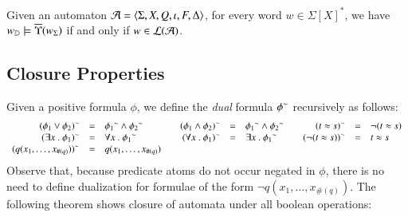 \documentclass{llncs}
\begin{document}
\begin{lemma}\label{lemma:substitution}
  Given an automaton $\mathcal{A} = \langle \Sigma,X,Q,\iota,F,\Delta \rangle$, for
  every word $w \in \Sigma[X]^*$, we have $w_{\mathbb{D}} \models
  \overline{\Upsilon}({w_\Sigma})$ if and only if $w \in {\mathcal L}({\mathcal{A}})$.
\end{lemma}

\subsection{Closure Properties}
\label{sec:closure}

Given a positive formula $\phi$, we define the \emph{dual} formula
${\phi}^{\sim}$ recursively as follows:
\[\begin{array}{rclcrclcrcl}
{(\phi_1 \vee \phi_2)}^{\sim} & = & {\phi_1}^{\sim} \wedge {\phi_2}^{\sim} && 
{(\phi_1 \wedge \phi_2)}^{\sim} & = & {\phi_1}^{\sim} \wedge {\phi_2}^{\sim} &&
{(t \approx s)}^{\sim} & = & \neg(t \approx s) \\
{(\exists x ~.~ \phi_1)}^{\sim} & = & \forall x ~.~ {\phi_1}^{\sim} && 
{(\forall x ~.~ \phi_1)}^{\sim} & = & \exists x ~.~ {\phi_1}^{\sim} && 
{(\neg(t \approx s))}^{\sim} & = & t \approx s \\
{(q(x_1,\ldots,x_{\#(q)}))}^{\sim} & = & q(x_1,\ldots,x_{\#(q)})
\end{array}\]
Observe that, because predicate atoms do not occur negated in $\phi$,
there is no need to define dualization for formulae of the form $\neg
q(x_1,\ldots,x_{\#(q)})$. The following theorem shows closure of
automata under all boolean operations:

\end{document}
